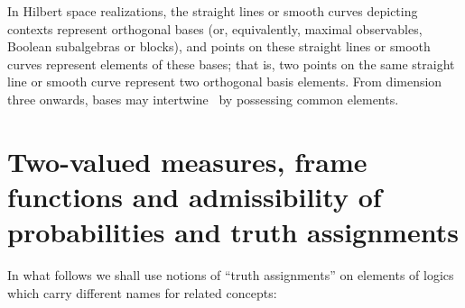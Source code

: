 \documentclass[%
  twocolumn,
 showpacs,
 showkeys,
 preprintnumbers,
 amsmath,amssymb,
 aps,
  pra,
  longbibliography,
 floatfix,
 ]{revtex4-1}
\begin{document}
In Hilbert space realizations,
the straight lines or smooth curves depicting contexts represent orthogonal bases (or, equivalently, maximal observables, Boolean subalgebras or blocks),
and points on these straight lines or smooth curves represent elements of these bases;
that is, two points  on the same straight line or smooth curve represent two orthogonal basis elements.
From dimension three onwards, bases may intertwine~\cite{Gleason} by possessing common elements.

\section{Two-valued measures, frame functions and admissibility of probabilities and truth assignments}
\label{2017-b-admissability}

In what follows we shall use notions of ``truth assignments'' on elements of logics which carry different names for related concepts:
\end{document}
